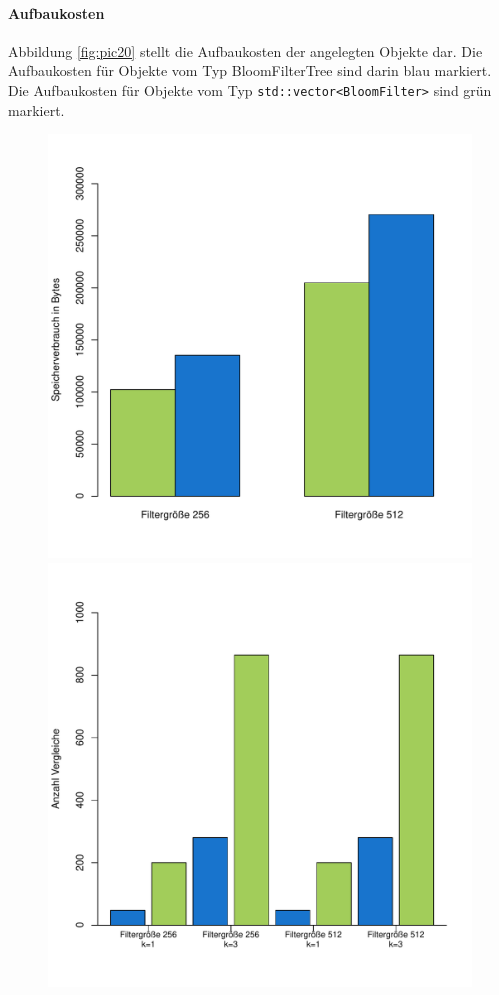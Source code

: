 \paragraph*{Aufbaukosten}
Abbildung \ref{fig:pic20} stellt die Aufbaukosten der angelegten Objekte dar. Die Aufbaukosten für Objekte vom Typ BloomFilterTree sind darin blau markiert. Die Aufbaukosten für Objekte vom Typ \texttt{std::vector<BloomFilter>} sind grün markiert. 
\begin{figure}[hptb]
	\centering
	\label{fig:pic18}
	\includegraphics[scale=0.7]{pictures/mem.pdf}\\
	\label{fig:pic19}
	\includegraphics[scale=0.7]{pictures/compl.pdf}
\end{figure} 
